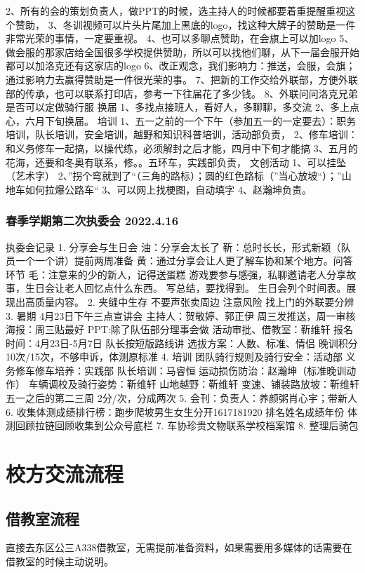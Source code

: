 \documentclass{ctexbook}
\begin{document}
2、所有的会的策划负责人，做PPT的时候，选主持人的时候都要着重提醒重视这个赞助，
3、冬训视频可以片头片尾加上黑底的logo，找这种大牌子的赞助是一件非常光荣的事情，一定要重视。
4、也可以多聊点赞助，在会旗上可以加logo
5、做会服的那家店给全国很多学校提供赞助，所以可以找他们聊，从下一届会服开始都可以加洛克还有这家店的logo
6、改正观念，我们影响力：推送，会服，会旗；通过影响力去赢得赞助是一件很光荣的事。
7、把新的工作交给外联部，方便外联部的传承，也可以联系打印店，参考一下往届花了多少钱。
8、外联问问洛克兄弟是否可以定做骑行服
换届
1、多找点接班人，看好人，多聊聊，多交流
2、多上点心，六月下旬换届。
培训
1、五一之前的一个下午（参加五一的一定要去）：职务培训，队长培训，安全培训，越野和知识科普培训，活动部负责，
2、修车培训：和义务修车一起搞，以操代练，必须解封之后才能，四月中下旬才能搞
3、五月的花海，还要和冬奥有联系，修。。五环车，实践部负责，
文创活动
1、可以挂坠（艺术字）
2、''拐个弯就到了``（三角的路标）；圆的红色路标（''当心放坡``）；''山地车如何拉爆公路车``
3、可以网上找梗图，自动填字
4、赵瀚坤负责。


\subsection{春季学期第二次执委会 2022.4.16}
执委会记录
1.	分享会与生日会
油：分享会太长了
靳：总时长长，形式新颖（队员一个一个讲）提前两周准备
黄：通过分享会让人更了解车协和某个地方。问答环节
毛：注意来的少的新人，记得送蛋糕
游戏要参与感强，私聊邀请老人分享故事，生日会让老人回忆点什么东西。
写总结，要找得到。
生日会列个时间表。展现出高质量内容。
2.	夹缝中生存
不要声张卖周边	
注意风险
找上门的外联要分辨
3.	暑期
4月23日下午三点宣讲会
主持人：贺敬婷、郭正伊
周三发推送，周一审核
海报：周三贴最好  
PPT:除了队伍部分理事会做
活动审批、借教室：靳维轩
报名时间：4月23日-5月7日
队长按短版路线讲
选拔方案：人数、标准、情侣
晚训积分10次/15次，不够申诉，体测原标准
4.	培训
团队骑行规则及骑行安全：活动部
义务修车修车培养：实践部
队长培训：马睿恒
运动损伤防治：赵瀚坤（标准晚训动作）
车辆调校及骑行姿势：靳维轩
山地越野：靳维轩
变速、铺装路放坡：靳维轩
五一之后的第二三周
2分/次，分成两次
5.	会刊：负责人：养颜粥肖心宇；带新人
6.	收集体测成绩排行榜：跑步爬坡男生女生分开1617181920
排名姓名成绩年份
体测回顾拉链回顾收集到公众号底栏
7.	车协珍贵文物联系学校档案馆
8.	整理后骑包

\chapter{校方交流流程} 
\section{借教室流程}
直接去东区公三A338借教室，无需提前准备资料，如果需要用多媒体的话需要在借教室的时候主动说明。
\end{document}
